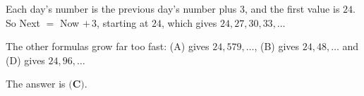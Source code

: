 Each day's number is the previous day's number plus $3$, and the first value is $24$. So Next $=$ Now $+\,3$, starting at $24$, which gives $24,27,30,33,\dots$

The other formulas grow far too fast: (A) gives $24,579,\dots$, (B) gives $24,48,\dots$ and (D) gives $24,96,\dots$

The answer is $\boxed{\textbf{(C)}}$.
